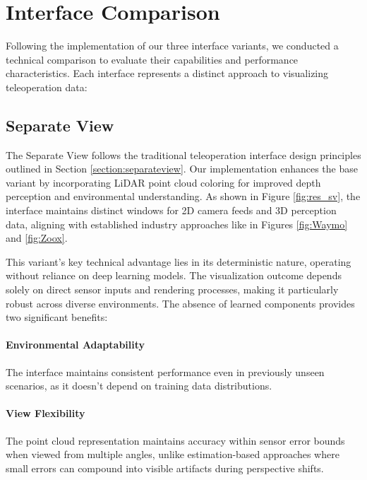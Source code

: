 \section{Interface Comparison}

Following the implementation of our three interface variants, we conducted a technical comparison to evaluate their capabilities and performance characteristics. Each interface represents a distinct approach to visualizing teleoperation data:

\subsection*{Separate View}

The Separate View follows the traditional teleoperation interface design principles outlined in Section \ref{section:separateview}. Our implementation enhances the base variant by incorporating \ac{LiDAR} point cloud coloring for improved depth perception and environmental understanding. As shown in Figure \ref{fig:res_sv}, the interface maintains distinct windows for 2D camera feeds and 3D perception data, aligning with established industry approaches like in Figures \ref{fig:Waymo} and \ref{fig:Zoox}.

This variant's key technical advantage lies in its deterministic nature, operating without reliance on deep learning models. The visualization outcome depends solely on direct sensor inputs and rendering processes, making it particularly robust across diverse environments. The absence of learned components provides two significant benefits:
\paragraph{Environmental Adaptability}
The interface maintains consistent performance even in previously unseen scenarios, as it doesn't depend on training data distributions.
\paragraph{View Flexibility}
The point cloud representation maintains accuracy within sensor error bounds when viewed from multiple angles, unlike estimation-based approaches where small errors can compound into visible artifacts during perspective shifts.


